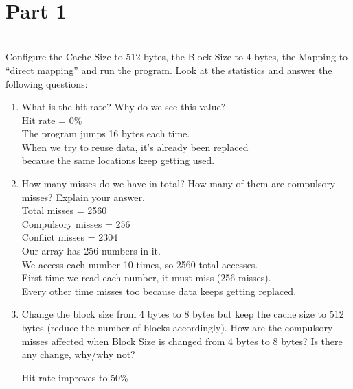 \documentclass{article}\\
\begin{document}
\\

\section*{Part 1}\\

Configure the Cache Size to 512 bytes, the Block Size to 4 bytes, the Mapping to ``direct mapping'' and run the program. Look at the statistics and answer the following questions:\\

\begin{enumerate}\\
    \item What is the hit rate? Why do we see this value?\\
    
    Hit rate = 0\%\\
    
    The program jumps 16 bytes each time.\\
    When we try to reuse data, it's already been replaced\\
    because the same locations keep getting used.\\

    \item How many misses do we have in total? How many of them are compulsory misses? Explain your answer.\\
    
    Total misses = 2560\\
    Compulsory misses = 256\\
    Conflict misses = 2304\\
    
    Our array has 256 numbers in it.\\
    We access each number 10 times, so 2560 total accesses.\\
    First time we read each number, it must miss (256 misses).\\
    Every other time misses too because data keeps getting replaced.\\

    \item Change the block size from 4 bytes to 8 bytes but keep the cache size to 512 bytes (reduce the number of blocks accordingly). How are the compulsory misses affected when Block Size is changed from 4 bytes to 8 bytes? Is there any change, why/why not?
    
    Hit rate improves to 50\%\\
    

\end{enumerate}
\end{document}

